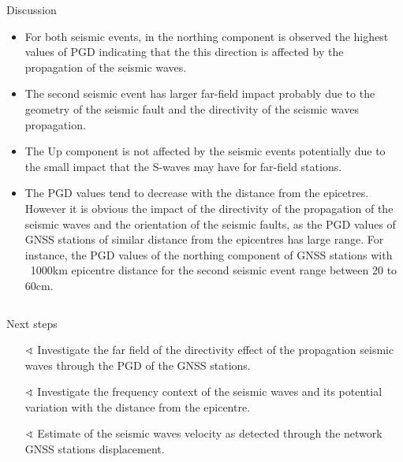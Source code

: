 \documentclass[final,a0,portrait]{beamer}
\newlength{\onecolwid}
\newlength{\twocolwid}
\begin{document}
\begin{frame}[t]
\begin{columns}[t]
\begin{column}{\twocolwid}
\begin{columns}[t]
\begin{column}{\onecolwid}
\begin{block}{Discussion}
{\begin{itemize}\setlength\itemsep{.6em} \justifying
  \item For both seismic events, in the northing component is observed the highest values of PGD indicating that the this direction is affected by the propagation of the seismic waves.
  \item The second seismic event has larger far-field impact probably due to the geometry of the seismic fault and the directivity of the seismic waves propagation.
  \item The Up component is not affected by the seismic events potentially due to the small impact that the S-waves may have for far-field stations.
  \item The PGD values tend to decrease with the distance from the epicetres. However it is obvious the impact of the directivity of the propagation of the seismic waves and the orientation of the seismic faults, as the PGD values of GNSS stations of similar distance from the epicentres has large range. For instance, the PGD values of the northing component of GNSS stations with ~1000km epicentre distance for the second seismic event range between 20 to 60cm.
\end{itemize}
}



\end{block}
\end{column}
\end{columns}

\vspace*{-2.6cm}
\begin{block}{Next steps}
{\small
\begin{itemize}\setlength\itemsep{.5em}
  \item[$\sphericalangle$] Investigate the far field of the directivity effect of the propagation seismic waves through the PGD of the GNSS stations.
  \item[$\sphericalangle$] Investigate the frequency context of the seismic waves and its potential variation with the distance from the epicentre.
  \item[$\sphericalangle$] Estimate of the seismic waves velocity as detected through the network GNSS stations displacement.
\end{itemize}
}

\end{block}

\begin{column}{\twocolwid}
\vspace*{-2.9cm}
\begin{block}{\vspace*{-4ex}}


\end{block}
\end{column}
\end{column}
\end{columns}
\end{frame}
\end{document}
